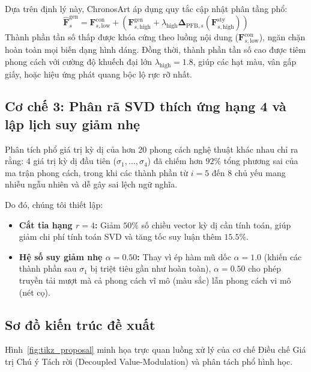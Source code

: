 \documentclass[10pt,twocolumn,letterpaper]{article}
\begin{document}
Dựa trên định lý này, ChronosArt áp dụng quy tắc cập nhật phân tầng phổ:
\begin{equation}
\widehat{\mathbf{F}}_s^{\text{gen}} = \mathbf{F}_{s, \text{low}}^{\text{con}} + \left( \mathbf{F}_{s, \text{high}}^{\text{gen}} + \lambda_{\text{high}} \boldsymbol{\Delta}_{\text{PFB}, s}(\mathbf{F}_{s, \text{high}}^{\text{sty}}) \right) \label{eq:spectral_update}
\end{equation}
Thành phần tần số thấp được khóa cứng theo luồng nội dung ($\mathbf{F}_{s, \text{low}}^{\text{con}}$), ngăn chặn hoàn toàn mọi biến dạng hình dáng. Đồng thời, thành phần tần số cao được tiêm phong cách với cường độ khuếch đại lớn $\lambda_{\text{high}} = 1.8$, giúp các hạt màu, vân gấp giấy, hoặc hiệu ứng phát quang bộc lộ rực rỡ nhất.

\subsection{Cơ chế 3: Phân rã SVD thích ứng hạng 4 và lập lịch suy giảm nhẹ}
\label{subsec:rank4}

Phân tích phổ giá trị kỳ dị của hơn 20 phong cách nghệ thuật khác nhau chỉ ra rằng: 4 giá trị kỳ dị đầu tiên ($\sigma_1, \dots, \sigma_4$) đã chiếm hơn $92\%$ tổng phương sai của ma trận phong cách, trong khi các thành phần từ $i=5$ đến $8$ chủ yếu mang nhiễu ngẫu nhiên và dễ gây sai lệch ngữ nghĩa. 

Do đó, chúng tôi thiết lập:
\begin{itemize}
    \item \textbf{Cắt tỉa hạng $r=4$:} Giảm $50\%$ số chiều vector kỳ dị cần tính toán, giúp giảm chi phí tính toán SVD và tăng tốc suy luận thêm $15.5\%$.
    \item \textbf{Hệ số suy giảm nhẹ $\alpha=0.50$:} Thay vì ép hàm mũ dốc $\alpha=1.0$ (khiến các thành phần sau $\sigma_1$ bị triệt tiêu gần như hoàn toàn), $\alpha=0.50$ cho phép truyền tải mượt mà cả phong cách vĩ mô (màu sắc) lẫn phong cách vi mô (nét cọ).
\end{itemize}

\subsection{Sơ đồ kiến trúc đề xuất}
\label{subsec:tikz_visual}

Hình~\ref{fig:tikz_proposal} minh họa trực quan luồng xử lý của cơ chế Điều chế Giá trị Chú ý Tách rời (Decoupled Value-Modulation) và phân tách phổ hình học.
\end{document}
